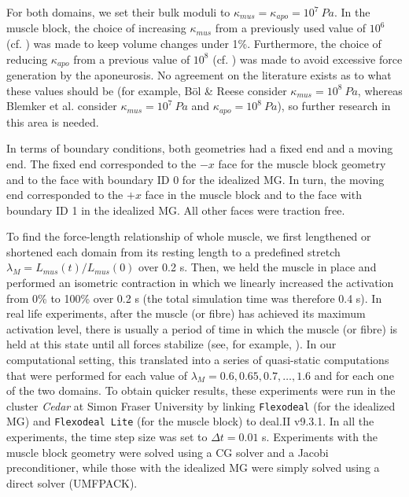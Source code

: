 \documentclass{sfuthesis}
\numberwithin{equation}{section}
\numberwithin{figure}{chapter}
\numberwithin{table}{chapter}
\theoremstyle{definition}
\begin{document}
For both domains, we set their bulk moduli to $\kappa_{mus} = \kappa_{apo} = 10^7 \ \unit{Pa}$. In the muscle block, the choice of increasing $\kappa_{mus}$ from a previously used value of $10^6$ (cf. \cite{Paper3_RossEtAl2021,Paper2_RyanEtAl2020,Paper1_WakelingEtAl2020}) was made to keep volume changes under 1\%. Furthermore, the choice of reducing $\kappa_{apo}$ from a previous value of $10^8$ (cf. \cite{KonnoNigamWakeling2021_ECM, KonnoEtAl2022_CP}) was made to avoid excessive force generation by the aponeurosis. No agreement on the literature exists as to what these values should be (for example, B\"{o}l \& Reese \cite{BolReese2008} consider $\kappa_{mus} = 10^8 \ \unit{Pa}$, whereas Blemker et al. \cite{BlemkerPinskyDelp2005} consider $\kappa_{mus} = 10^7 \ \unit{Pa}$ and $\kappa_{apo} = 10^8 \ \unit{Pa}$), so further research in this area is needed.

In terms of boundary conditions, both geometries had a fixed end and a moving end. The fixed end corresponded to the $-x$ face for the muscle block geometry and to the face with boundary ID 0 for the idealized MG. In turn, the moving end corresponded to the $+x$ face in the muscle block and to the face with boundary ID 1 in the idealized MG. All other faces were traction free.

To find the force-length relationship of whole muscle, we first lengthened or shortened each domain from its resting length to a predefined stretch $\lambda_M= L_{mus}(t)/L_{mus}(0)$ over 0.2 s. Then, we held the muscle in place and performed an isometric contraction in which we linearly increased the activation from 0\% to 100\% over 0.2 s (the total simulation time was therefore 0.4 s). In real life experiments, after the muscle (or fibre) has achieved its maximum activation level, there is usually a period of time in which the muscle (or fibre) is held at this state until all forces stabilize (see, for example, \cite{Gareis1992,HerzogLeonard2002}). In our computational setting, this translated into a series of quasi-static computations that were performed for each value of $\lambda_M = 0.6, 0.65, 0.7, \dots, 1.6$ and for each one of the two domains. To obtain quicker results, these experiments were run in the cluster \textit{Cedar} at Simon Fraser University by linking \texttt{Flexodeal} (for the idealized MG) and \texttt{Flexodeal Lite} (for the muscle block) to deal.II v9.3.1. In all the experiments, the time step size was set to $\Delta t = 0.01$ s. Experiments with the muscle block geometry were solved using a CG solver and a Jacobi preconditioner, while those with the idealized MG were simply solved using a direct solver (UMFPACK).
\end{document}
